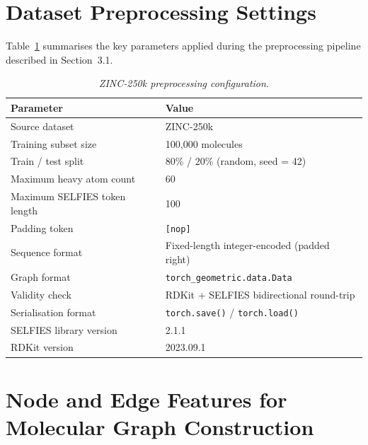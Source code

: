 \documentclass[12pt,a4paper]{report}
\begin{document}
\bigskip

\section{Dataset Preprocessing Settings}

Table~\ref{tab:preprocessing} summarises the key parameters applied during the preprocessing pipeline described in Section~3.1.

\begin{table}[htbp]
\centering
\caption{\textit{ZINC-250k preprocessing configuration.}}
\label{tab:preprocessing}
\renewcommand{\arraystretch}{1.1}
\begin{tabular}{ll}
\hline
\textbf{Parameter}               & \textbf{Value} \\
\hline
Source dataset                   & ZINC-250k \\
Training subset size             & 100{,}000 molecules \\
Train / test split               & 80\% / 20\% (random, seed = 42) \\
Maximum heavy atom count         & 60 \\
Maximum SELFIES token length     & 100 \\
Padding token                    & \texttt{[nop]} \\
Sequence format                  & Fixed-length integer-encoded (padded right) \\
Graph format                     & \texttt{torch\_geometric.data.Data} \\
Validity check                   & RDKit + SELFIES bidirectional round-trip \\
Serialisation format             & \texttt{torch.save()} / \texttt{torch.load()} \\
SELFIES library version          & 2.1.1 \\
RDKit version                    & 2023.09.1 \\
\hline
\end{tabular}
\end{table}

\bigskip

\section{Node and Edge Features for Molecular Graph Construction}
\end{document}
